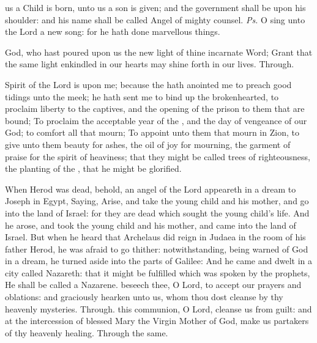 
\introit
{} us a Child is born, unto us a son is given; and the government shall be upon his shoulder: and his name shall be called Angel of mighty counsel. \textit{Ps.} O sing unto the Lord a new song: for he hath done marvellous things.

\collect
{} God, who hast poured upon us the new light of thine incarnate Word; Grant that the same light enkindled in our hearts may shine forth in our lives. Through.

 Spirit of the Lord  is upon me; because the  hath anointed me to preach good tidings unto the meek; he hath sent me to bind up the brokenhearted, to proclaim liberty to the captives, and the opening of the prison to them that are bound; To proclaim the acceptable year of the , and the day of vengeance of our God; to comfort all that mourn; To appoint unto them that mourn in Zion, to give unto them beauty for ashes, the oil of joy for mourning, the garment of praise for the spirit of heaviness; that they might be called trees of righteousness, the planting of the , that he might be glorified.


 When Herod was dead, behold, an angel of the Lord appeareth in a dream to Joseph in Egypt, Saying, Arise, and take the young child and his mother, and go into the land of Israel: for they are dead which sought the young child's life. And he arose, and took the young child and his mother, and came into the land of Israel. But when he heard that Archelaus did reign in Judaea in the room of his father Herod, he was afraid to go thither: notwithstanding, being warned of God in a dream, he turned aside into the parts of Galilee: And he came and dwelt in a city called Nazareth: that it might be fulfilled which was spoken by the prophets, He shall be called a Nazarene.
\secret
{} beseech thee, O Lord, to accept our prayers and oblations: and graciously hearken unto us, whom thou dost cleanse by thy heavenly mysteries. Through.
\postcommunion
{} this communion, O Lord, cleanse us from guilt: and at the intercession of blessed Mary the Virgin Mother of God, make us partakers of thy heavenly healing. Through the same.


